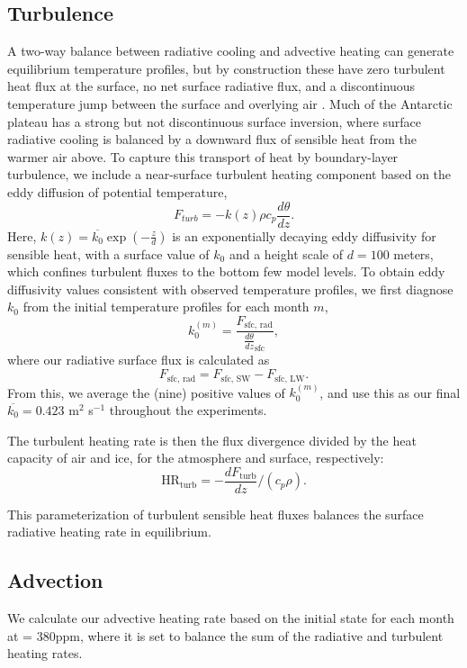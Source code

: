 \documentclass[draft]{agujournal2019}
\begin{document}
\subsection{Turbulence}
A two-way balance between radiative cooling and advective heating can generate equilibrium temperature profiles, but by construction these have zero turbulent heat flux at the surface, no net surface radiative flux, and a discontinuous temperature jump between the surface and overlying air \cite{cronin_analytic_2016}. Much of the Antarctic plateau has a strong but not discontinuous surface inversion, where surface radiative cooling is balanced by a downward flux of sensible heat from the warmer air above. To capture this transport of heat by boundary-layer turbulence, we include a near-surface turbulent heating component based on the eddy diffusion of potential temperature,
\begin{equation}
    F_{turb} = -k(z) \rho c_p \frac{d\theta}{dz}.
\end{equation}
Here, $k(z) = \overline{k_0} \exp(-\frac{z}{d})$ is an exponentially decaying eddy diffusivity for sensible heat, with a surface value of $k_0$ and a height scale of $d = 100$ meters, which confines turbulent fluxes to the bottom few model levels. To obtain eddy diffusivity values consistent with observed temperature profiles, we first diagnose $k_0$ from the initial temperature profiles for each month $m$,
\begin{equation}
    k_0^{(m)} = \frac{F_{\text{sfc, rad}}}{\frac{d\theta}{dz}_{\text{sfc}}},
\end{equation}
where our radiative surface flux is calculated as
\begin{equation}
    F_{\text{sfc, rad}} = F_{\text{sfc, SW}} - F_{\text{sfc, LW}}.
\end{equation}
From this, we average the (nine) positive values of $k_0^{(m)}$, and use this as our final $\overline{k_0} = 0.423$ m$^{2}$ s$^{-1}$ throughout the experiments.

The turbulent heating rate is then the flux divergence divided by the heat capacity of air and ice, for the atmosphere and surface, respectively:
\begin{equation}
    \text{HR}_{\text{turb}} = -\frac{dF_{\text{turb}}}{dz} /(c_p \rho).
\end{equation}

This parameterization of turbulent sensible heat fluxes balances the surface radiative heating rate in equilibrium.

\subsection{Advection}
We calculate our advective heating rate based on the initial state for each month at  = 380ppm, where it is set to balance the sum of the radiative and turbulent heating rates.
\end{document}
